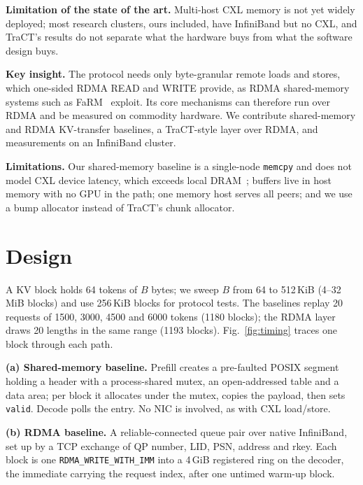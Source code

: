 \documentclass[conference]{IEEEtran}
\begin{document}
\textbf{Limitation of the state of the art.} Multi-host CXL memory is not yet widely deployed; most research clusters, ours included, have InfiniBand but no CXL, and TraCT's results do not separate what the hardware buys from what the software design buys.

\textbf{Key insight.} The protocol needs only byte-granular remote loads and stores, which one-sided RDMA READ and WRITE provide, as RDMA shared-memory systems such as FaRM~\cite{farm} exploit. Its core mechanisms can therefore run over RDMA and be measured on commodity hardware. We contribute shared-memory and RDMA KV-transfer baselines, a TraCT-style layer over RDMA, and measurements on an InfiniBand cluster.

\textbf{Limitations.} Our shared-memory baseline is a single-node \texttt{memcpy} and does not model CXL device latency, which exceeds local DRAM~\cite{pond}; buffers live in host memory with no GPU in the path; one memory host serves all peers; and we use a bump allocator instead of TraCT's chunk allocator.

\section{Design}
A KV block holds 64 tokens of $B$ bytes; we sweep $B$ from 64 to 512\,KiB (4--32\,MiB blocks) and use 256\,KiB blocks for protocol tests. The baselines replay 20 requests of 1500, 3000, 4500 and 6000 tokens (1180 blocks); the RDMA layer draws 20 lengths in the same range (1193 blocks). Fig.~\ref{fig:timing} traces one block through each path.

\textbf{(a) Shared-memory baseline.} Prefill creates a pre-faulted POSIX segment holding a header with a process-shared mutex, an open-addressed table and a data area; per block it allocates under the mutex, copies the payload, then sets \texttt{valid}. Decode polls the entry. No NIC is involved, as with CXL load/store.

\textbf{(b) RDMA baseline.} A reliable-connected queue pair over native InfiniBand, set up by a TCP exchange of QP number, LID, PSN, address and rkey. Each block is one \texttt{RDMA\_WRITE\_WITH\_IMM} into a 4\,GiB registered ring on the decoder, the immediate carrying the request index, after one untimed warm-up block.
\end{document}
